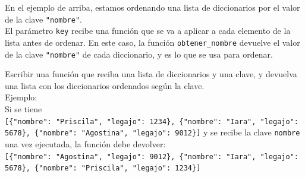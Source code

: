 \documentclass[
  letterpaper,
  DIV=11,
  numbers=noendperiod]{scrreprt}
\begin{document}
\begin{tcolorbox}[enhanced jigsaw, bottomrule=.15mm, leftrule=.75mm, opacityback=0, colback=white, toprule=.15mm, bottomtitle=1mm, opacitybacktitle=0.6, rightrule=.15mm, left=2mm, arc=.35mm, coltitle=black, title=\textcolor{quarto-callout-note-color}{\faInfo}\hspace{0.5em}{Note}, breakable, toptitle=1mm, colframe=quarto-callout-note-color-frame, titlerule=0mm, colbacktitle=quarto-callout-note-color!10!white]

En el ejemplo de arriba, estamos ordenando una lista de diccionarios por
el valor de la clave \texttt{"nombre"}.\\
El parámetro \texttt{key} recibe una función que se va a aplicar a cada
elemento de la lista antes de ordenar. En este caso, la función
\texttt{obtener\_nombre} devuelve el valor de la clave \texttt{"nombre"}
de cada diccionario, y es lo que se usa para ordenar.

\end{tcolorbox}

\begin{tcolorbox}[enhanced jigsaw, bottomrule=.15mm, leftrule=.75mm, opacityback=0, colback=white, toprule=.15mm, bottomtitle=1mm, opacitybacktitle=0.6, rightrule=.15mm, left=2mm, arc=.35mm, coltitle=black, title=\textcolor{quarto-callout-important-color}{\faExclamation}\hspace{0.5em}{Ejercicio Desafío}, breakable, toptitle=1mm, colframe=quarto-callout-important-color-frame, titlerule=0mm, colbacktitle=quarto-callout-important-color!10!white]

Escribir una función que reciba una lista de diccionarios y una clave, y
devuelva una lista con los diccionarios ordenados según la clave.\\

Ejemplo:\\
Si se tiene
\texttt{{[}\{"nombre":\ "Priscila",\ "legajo":\ 1234\},\ \{"nombre":\ "Iara",\ "legajo":\ 5678\},\ \{"nombre":\ "Agostina",\ "legajo":\ 9012\}{]}}
y se recibe la clave \texttt{nombre}\\
una vez ejecutada, la función debe devolver:\\
\texttt{{[}\{"nombre":\ "Agostina",\ "legajo":\ 9012\},\ \{"nombre":\ "Iara",\ "legajo":\ 5678\},\ \{"nombre":\ "Priscila",\ "legajo":\ 1234\}{]}}\strut \\

\end{tcolorbox}
\end{document}

